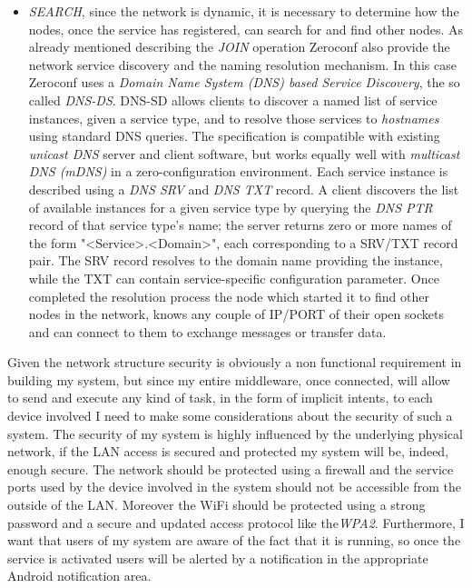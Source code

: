 \begin{itemize}
	\item \textit{SEARCH}, since the network is dynamic, it is necessary to determine how the nodes, once the service has registered, can search for and find other nodes. As already mentioned describing the \textit{JOIN} operation Zeroconf also provide the network service discovery and the naming resolution mechanism. In this case Zeroconf uses a \textit{Domain Name System (DNS) based Service Discovery}, the so called \textit{DNS-DS}. DNS-SD allows clients to discover a named list of service instances, given a service type, and to resolve those services to \textit{hostnames} using standard DNS queries. The specification is compatible with existing \textit{unicast DNS} server and client software, but works equally well with \textit{multicast DNS (mDNS)} in a zero-configuration environment. Each service instance is described using a \textit{DNS SRV} and \textit{DNS TXT} record. A client discovers the list of available instances for a given service type by querying the \textit{DNS PTR} record of that service type's name; the server returns zero or more names of the form "<Service>.<Domain>", each corresponding to a SRV/TXT record pair. The SRV record resolves to the domain name providing the instance, while the TXT can contain service-specific configuration parameter. Once completed the resolution process the node which started it to find other nodes in the network, knows any couple of IP/PORT of their open sockets and can connect to them to exchange messages or transfer data.
\end{itemize}
Given the network structure security is obviously a non functional requirement in building my system, but since my entire middleware, once connected, will allow to send and execute any kind of task, in the form of implicit intents, to each device involved I need to make some considerations about the security of such a system. The security of my system is highly influenced by the underlying physical network, if the LAN access is secured and protected my system will be, indeed, enough secure. The network should be protected using a firewall and the service ports used by the device involved in the system should not be accessible from the outside of the LAN. Moreover the WiFi should be protected using a strong password and a secure and updated access protocol like the\textit{WPA2}. Furthermore, I want that users of my system are aware of the fact that it is running, so once the service is activated users will be alerted by a notification in the appropriate Android notification area.
 
